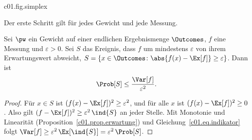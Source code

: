 \begin{vertiefung}
  \begin{tpcfigure}{c01.fig.simplex}
    \caption{Die Menge aller Gewichte. (a) Zwei Ergebnisse: die Strecke zwischen den
      Punktgewichten $\pw_1 = (1,0)$ und $\pw_2 = (0,1)$ in der Ebene der Koordinaten
      $\pw(1)$, $\pw(2)$; eingetragen ist $\pw = (\tfrac14, \tfrac34)$. (b) Drei
      Ergebnisse: ein Dreieck mit den Punktgewichten als Ecken. Eingetragen sind das
      gleichmäßige Gewicht $(\tfrac13, \tfrac13, \tfrac13)$ im Schwerpunkt und das Gewicht
      $(\tfrac12, \tfrac13, \tfrac16)$, das näher an $\pw_1$ liegt. Gefüllte Punkte sind
      Punktgewichte, offene Kreise echte Mischungen.}
  \end{tpcfigure}
\end{vertiefung}

\begin{vertiefung}[id=c01.v2,
    titel={Wie nah liegen relative Häufigkeiten an den Wahrscheinlichkeiten?},
    wozu={Der Kern beschränkt die statistische Lesart auf unabhängige Wiederholungen
      derselben Präparation. Hier wird eine obere Schranke für die Wahrscheinlichkeit
      einer Abweichung der relativen Häufigkeit um mindestens $\varepsilon > 0$ bewiesen;
      diese Schranke nimmt mit der positiven ganzen Anzahl der Wiederholungen ab.},
    voraussetzung={Abschnitte~\ref{c01.s2} und~\ref{c01.s3} bis
      Gleichung~\eqref{c01.eq.var-indikator}. Der Rest des Kurses benutzt nur das Ergebnis
      in Worten.},
    zurueck={Die Wahrscheinlichkeit, dass die relative Häufigkeit eines Ereignisses nach
      $N$ unabhängigen Wiederholungen um mindestens $\varepsilon$ von seiner
      Wahrscheinlichkeit abweicht, ist höchstens $1/(4N\varepsilon^2)$.}]
  Der erste Schritt gilt für jedes Gewicht und jede Messung.

  \begin{lemma}\label{c01.lem.tschebyscheff}
    Sei $\pw$ ein Gewicht auf einer endlichen Ergebnismenge $\Outcomes$, $f$ eine Messung
    und $\varepsilon > 0$. Sei $S$ das Ereignis, dass $f$ um mindestens $\varepsilon$ von
    ihrem Erwartungswert abweicht,
    $S = \{x \in \Outcomes \colon \abs{f(x) - \Ex[f]} \geq \varepsilon\}$. Dann ist
    \begin{equation}\label{c01.eq.tschebyscheff}
      \Prob[S] \leq \frac{\Var[f]}{\varepsilon^2} .
    \end{equation}
  \end{lemma}
  \begin{proof}
    Für $x \in S$ ist $(f(x) - \Ex[f])^2 \geq \varepsilon^2$, und für alle $x$ ist
    $(f(x) - \Ex[f])^2 \geq 0$. Also gilt $(f - \Ex[f])^2 \geq \varepsilon^2\, \ind{S}$ an
    jeder Stelle. Mit Monotonie und Linearität (Proposition~\ref{c01.prop.erwartung}) und
    Gleichung~\eqref{c01.eq.indikator} folgt
    $\Var[f] \geq \varepsilon^2\, \Ex[\ind{S}] = \varepsilon^2\, \Prob[S]$.
  \end{proof}


\end{vertiefung}
